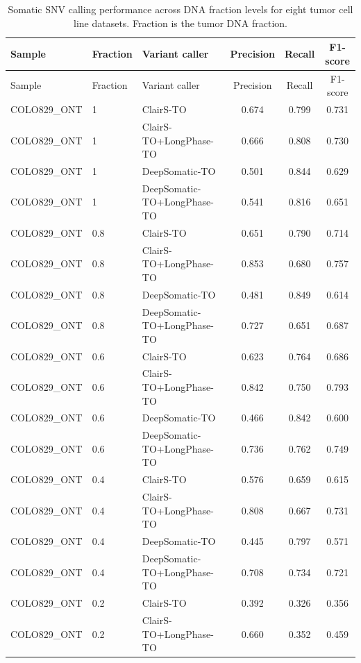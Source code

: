 \documentclass[pdflatex,sn-nature]{sn-jnl}
\begin{document}
\FloatBarrier
{\small
\begin{longtable}{@{}lllccc@{}}
  \caption[Somatic SNV calling performance across DNA fraction levels]%
  {Somatic SNV calling performance across DNA fraction levels for eight tumor cell line
  datasets. Fraction is the tumor DNA fraction.}
  \label{tab:somatic_purity}\\
  \toprule
  Sample & Fraction & Variant caller & Precision & Recall & F1-score \\
  \midrule
  \endfirsthead
  \toprule
  Sample & Fraction & Variant caller & Precision & Recall & F1-score \\
  \midrule
  \endhead
  \bottomrule
  \endlastfoot
  COLO829\_ONT & 1 & ClairS-TO & 0.674 & 0.799 & 0.731 \\
  COLO829\_ONT & 1 & ClairS-TO+LongPhase-TO & 0.666 & 0.808 & 0.730 \\
  COLO829\_ONT & 1 & DeepSomatic-TO & 0.501 & 0.844 & 0.629 \\
  COLO829\_ONT & 1 & DeepSomatic-TO+LongPhase-TO & 0.541 & 0.816 & 0.651 \\
  COLO829\_ONT & 0.8 & ClairS-TO & 0.651 & 0.790 & 0.714 \\
  COLO829\_ONT & 0.8 & ClairS-TO+LongPhase-TO & 0.853 & 0.680 & 0.757 \\
  COLO829\_ONT & 0.8 & DeepSomatic-TO & 0.481 & 0.849 & 0.614 \\
  COLO829\_ONT & 0.8 & DeepSomatic-TO+LongPhase-TO & 0.727 & 0.651 & 0.687 \\
  COLO829\_ONT & 0.6 & ClairS-TO & 0.623 & 0.764 & 0.686 \\
  COLO829\_ONT & 0.6 & ClairS-TO+LongPhase-TO & 0.842 & 0.750 & 0.793 \\
  COLO829\_ONT & 0.6 & DeepSomatic-TO & 0.466 & 0.842 & 0.600 \\
  COLO829\_ONT & 0.6 & DeepSomatic-TO+LongPhase-TO & 0.736 & 0.762 & 0.749 \\
  COLO829\_ONT & 0.4 & ClairS-TO & 0.576 & 0.659 & 0.615 \\
  COLO829\_ONT & 0.4 & ClairS-TO+LongPhase-TO & 0.808 & 0.667 & 0.731 \\
  COLO829\_ONT & 0.4 & DeepSomatic-TO & 0.445 & 0.797 & 0.571 \\
  COLO829\_ONT & 0.4 & DeepSomatic-TO+LongPhase-TO & 0.708 & 0.734 & 0.721 \\
  COLO829\_ONT & 0.2 & ClairS-TO & 0.392 & 0.326 & 0.356 \\
  COLO829\_ONT & 0.2 & ClairS-TO+LongPhase-TO & 0.660 & 0.352 & 0.459 \\

\end{longtable}}
\end{document}
